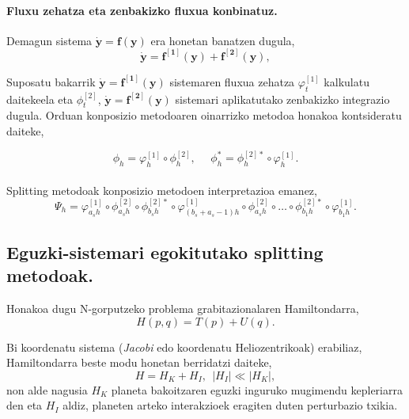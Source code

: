 \paragraph*{\textbf{Fluxu zehatza eta zenbakizko fluxua konbinatuz}.}
Demagun sistema $\dot{\mathbf{y}}=\mathbf{f}(\mathbf{y})$ era honetan banatzen dugula,
\begin{equation}
\dot{\mathbf{y}}=\mathbf{f^{[1]}}(\mathbf{y})+\mathbf{f^{[2]}}(\mathbf{y}),
\end{equation} 

Suposatu bakarrik $\dot{\mathbf{y}}=\mathbf{f^{[1]}}(\mathbf{y})$ sistemaren fluxua zehatza $\varphi_t^{[1]}$ kalkulatu daitekeela eta $\phi_t^{[2]}$, $\dot{\mathbf{y}}=\mathbf{f^{[2]}}(\mathbf{y})$ sistemari aplikatutako zenbakizko integrazio dugula. Orduan konposizio metodoaren oinarrizko metodoa honakoa kontsideratu daiteke,

\begin{equation*}
\phi_h=\varphi_h^{[1]} \circ \phi_h^{[2]}, \ \ \ \ \ \  \phi_h^{*}=\phi_h^{[2]*} \circ \varphi_h^{[1]}.
\end{equation*}


\paragraph*{} \emph{} Splitting metodoak konposizio metodoen interpretazioa emanez,
\begin{equation}
\Psi_h=\varphi^{[1]}_{a_{s} h} \circ \phi^{[2]}_{a_s h} \circ \phi^{[2]*}_{b_s h} \circ \varphi^{[1]}_{(b_s+a_s-1) h} \circ \phi^{[2]}_{a_s h} \circ \dots  \circ \phi^{[2]*}_{b_1 h} \circ \varphi^{[1]}_{b_1 h}.
\end{equation}


\subsection{Eguzki-sistemari egokitutako splitting metodoak.}

Honakoa dugu N-gorputzeko problema grabitazionalaren Hamiltondarra,
\begin{equation*}
H(p,q)=T(p)+U(q).
\end{equation*}

Bi koordenatu sistema (\emph{Jacobi} edo koordenatu Heliozentrikoak) erabiliaz,  Hamiltondarra beste modu honetan berridatzi daiteke,
\begin{equation*}
H=H_K+H_I,  \ \ |H_I|\ll|H_K|,
\end{equation*}
non alde nagusia $H_K$ planeta bakoitzaren eguzki inguruko mugimendu kepleriarra den eta $H_I$ aldiz, planeten arteko interakzioek eragiten duten perturbazio txikia.    

